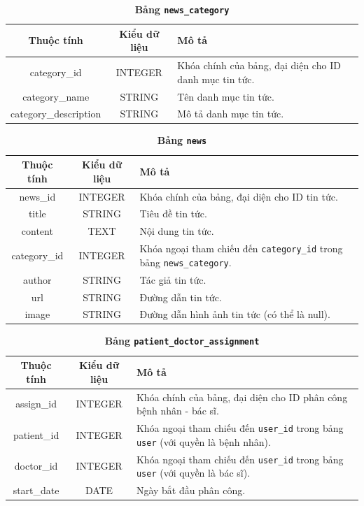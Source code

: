 \documentclass{article}%
\begin{document}
\begin{table}[H]
  \caption{\bfseries \fontsize{12pt}{0pt}\selectfont Bảng \texttt{news\_category}}
  \centering
  \begin{tabularx}{0.9\textwidth}{|c|c|X|}
    \hline
    \textbf{Thuộc tính} & \textbf{Kiểu dữ liệu} & \textbf{Mô tả} \\
    \hline
    category\_id & INTEGER & Khóa chính của bảng, đại diện cho ID danh mục tin tức. \\
    \hline
    category\_name & STRING & Tên danh mục tin tức. \\
    \hline
    category\_description & STRING & Mô tả danh mục tin tức. \\
    \hline
  \end{tabularx}
\end{table}

\begin{table}[H]
  \caption{\bfseries \fontsize{12pt}{0pt}\selectfont Bảng \texttt{news}}
  \centering
  \begin{tabularx}{0.9\textwidth}{|c|c|X|}
    \hline
    \textbf{Thuộc tính} & \textbf{Kiểu dữ liệu} & \textbf{Mô tả} \\
    \hline
    news\_id & INTEGER & Khóa chính của bảng, đại diện cho ID tin tức. \\
    \hline
    title & STRING & Tiêu đề tin tức. \\
    \hline
    content & TEXT & Nội dung tin tức. \\
    \hline
    category\_id & INTEGER & Khóa ngoại tham chiếu đến \texttt{category\_id} trong bảng \texttt{news\_category}. \\
    \hline
    author & STRING & Tác giả tin tức. \\
    \hline
    url & STRING & Đường dẫn tin tức. \\
    \hline
    image & STRING & Đường dẫn hình ảnh tin tức (có thể là null). \\
    \hline
  \end{tabularx}
\end{table}

\begin{table}[H]
  \caption{\bfseries \fontsize{12pt}{0pt}\selectfont Bảng \texttt{patient\_doctor\_assignment}}
  \centering
  \begin{tabularx}{0.9\textwidth}{|c|c|X|}
    \hline
    \textbf{Thuộc tính} & \textbf{Kiểu dữ liệu} & \textbf{Mô tả} \\
    \hline
    assign\_id & INTEGER & Khóa chính của bảng, đại diện cho ID phân công bệnh nhân - bác sĩ. \\
    \hline
    patient\_id & INTEGER & Khóa ngoại tham chiếu đến \texttt{user\_id} trong bảng \texttt{user} (với quyền là bệnh nhân). \\
    \hline
    doctor\_id & INTEGER & Khóa ngoại tham chiếu đến \texttt{user\_id} trong bảng \texttt{user} (với quyền là bác sĩ). \\
    \hline
    start\_date & DATE & Ngày bắt đầu phân công. \\
    \hline
  \end{tabularx}
\end{table}
\end{document}
